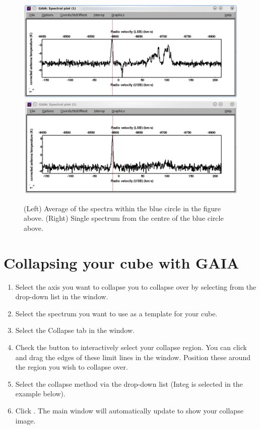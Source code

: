 \documentclass[11pt,oneside,chapters]{starlink}
\begin{document}
\begin{enumerate}[label=(\textbf{\arabic*})]
\begin{figure}[ht!]
\begin{center}
\includegraphics[width=0.48\linewidth]{sc20_gaia_avgspec2}
\hspace{0.5mm}
\includegraphics[width=0.48\linewidth]{sc20_gaia_avgspec3}
\caption[Example of averaged spectra.]{\label{fig:gaia_avgspec2}
 (Left) Average of the spectra within the blue circle in the figure
  above. (Right) Single spectrum from the centre of the blue circle above.}
\end{center}
\end{figure}

\end{enumerate}

\section{Collapsing your cube with GAIA}
\label{sec:gaiacollapse}

\begin{enumerate}[label=(\textbf{\arabic*})]

\item Select the axis you want to collapse you to collapse over by
selecting from the  drop-down list in the
 window.

\item Select the spectrum you want to use as a template for your cube.

\item Select the Collapse tab in the  window.

\item Check the  button to
interactively select your collapse region.  You can click and drag the
edges of these limit lines in the  window.
Position these around the region you wish to collapse over.

\item Select the collapse method via the  drop-down list (Integ is selected in the example below).

\item Click . The main window will automatically update
to show your collapse image.
\end{enumerate}
\end{document}
